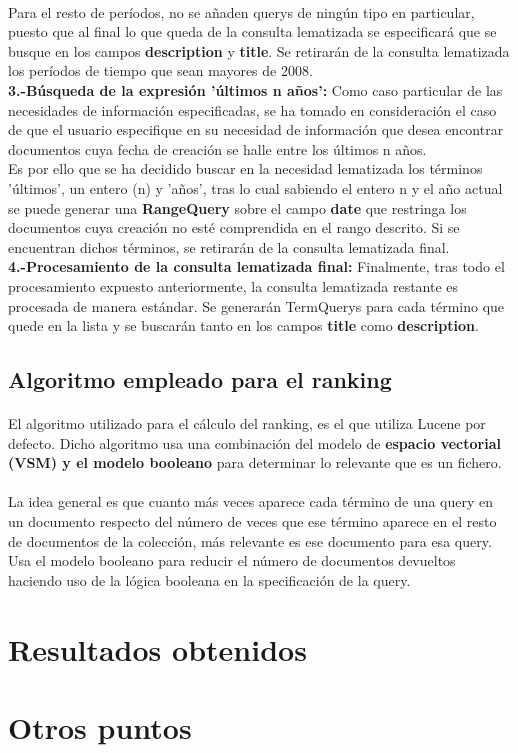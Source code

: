 \documentclass[a4paper]{article}
\begin{document}
\begin{itemize}
	\paragraph{}Para el resto de períodos, no se añaden querys de ningún tipo en particular, puesto que al final lo que queda de la consulta lematizada se especificará que se busque en los campos \textbf{description} y \textbf{title}. Se retirarán de la consulta lematizada los períodos de tiempo que sean mayores de 2008.
	\\
	\newline \textbf{3.-Búsqueda de la expresión 'últimos n años':} Como caso particular de las necesidades de información especificadas, se ha tomado en consideración el caso de que el usuario especifique en su necesidad de información que desea encontrar documentos cuya fecha de creación se halle entre los últimos n años.
	\\ 
	\newline Es por ello que se ha decidido buscar en la necesidad lematizada los términos 'últimos', un entero (n) y 'años', tras lo cual sabiendo el entero n y el año actual se puede generar una \textbf{RangeQuery} sobre el campo \textbf{date} que restringa los documentos cuya creación no esté comprendida en el rango descrito. Si se encuentran dichos términos, se retirarán de la consulta lematizada final.
	\\
	\newline \textbf{4.-Procesamiento de la consulta lematizada final:} Finalmente, tras todo el procesamiento expuesto anteriormente, la consulta lematizada restante es procesada de manera estándar. Se generarán TermQuerys para cada término que quede en la lista y se buscarán tanto en los campos \textbf{title} como \textbf{description}.
\end{itemize}
\newpage
\subsection{Algoritmo empleado para el ranking}
\paragraph{}El algoritmo utilizado para el cálculo del ranking, es el que utiliza Lucene por defecto. Dicho algoritmo usa una combinación del modelo de \textbf{espacio vectorial (VSM) y el modelo booleano} para determinar lo relevante que es un fichero.
\paragraph{}La idea general es que cuanto más veces aparece cada término de una query en un documento respecto del número de veces que ese término aparece en el resto de documentos de la colección, más relevante es ese documento para esa query.
Usa el modelo booleano para reducir el número de documentos devueltos haciendo uso de la lógica booleana en la specificación de la query.
\section{Resultados obtenidos}

\section{Otros puntos}
\end{document}
